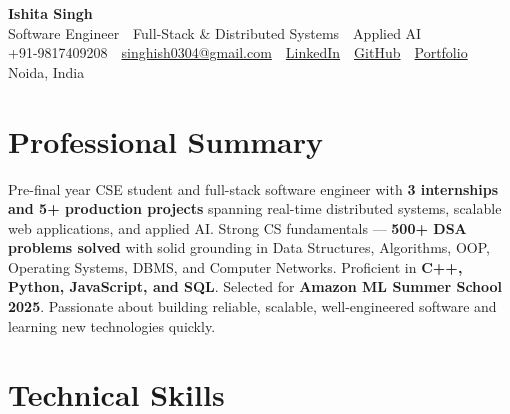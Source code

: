\documentclass[a4paper,10.5pt]{article}
\begin{document}
\begin{center}
  {\fontsize{22}{26}\selectfont \textbf{\color{accent}Ishita Singh}}\\[3pt]
  {\small Software Engineer \,\textbar\, Full-Stack \& Distributed Systems \,\textbar\, Applied AI}\\[5pt]
  {\small
    +91-9817409208
    \,\textbar\,
    \href{mailto:singhish0304@gmail.com}{singhish0304@gmail.com}
    \,\textbar\,
    \href{https://linkedin.com/in/ishita-singh-7b98752aa}{LinkedIn}
    \,\textbar\,
    \href{https://github.com/Ishita-coder27}{GitHub}
    \,\textbar\,
    \href{https://portfolioo-jade-iota.vercel.app/}{Portfolio}
    \,\textbar\,
    Noida, India
  }
\end{center}

\vspace{2pt}

\section*{Professional Summary}

Pre-final year CSE student and full-stack software engineer with \textbf{3 internships and 5+ production projects} spanning real-time distributed systems, scalable web applications, and applied AI. Strong CS fundamentals --- \textbf{500+ DSA problems solved} with solid grounding in Data Structures, Algorithms, OOP, Operating Systems, DBMS, and Computer Networks. Proficient in \textbf{C++, Python, JavaScript, and SQL}. Selected for \textbf{Amazon ML Summer School 2025}. Passionate about building reliable, scalable, well-engineered software and learning new technologies quickly.

\section*{Technical Skills}
\end{document}
